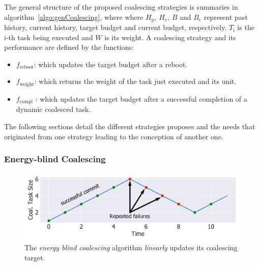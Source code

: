 



The general structure of the proposed coalescing strategies is summaries in algorithm~\ref{algo:genCoalescing}, where where $H_\text{p}$, $H_\text{c}$, $B$ and $B_\text{c}$ represent past history, current history, target budget and current budget, respectively. $T_\text{i}$ is the i-th task being executed and $W$ is its weight.
A coalescing strategy and its performance are defined by the functions:
\begin{itemize}
\item $f_\text{reboot}$: which updates the target budget after a reboot.
\item $f_\text{weight}$: which returns the weight of the task just executed and its unit. 
\item $f_\text{compl}$ : which updates the target budget after a successful completion of a dynamic coalesced task.
\end{itemize}
The following sections detail the different strategies \sys proposes and the needs that originated from one strategy leading to the conception of another one.

\subsubsection{Energy-blind Coalescing}
\label{subsec:energyBlind}

\begin{figure}
	\centering
	\includegraphics[width=0.5\columnwidth]{figures/slowCoal}
	\caption{The {\em energy blind coalescing} algorithm \emph{linearly} updates its coalescing target.}
	\label{fig:slowCoal}
\end{figure}

